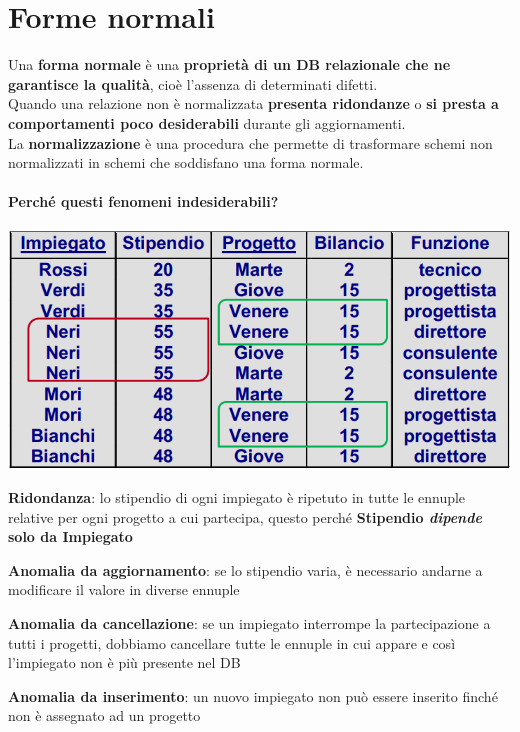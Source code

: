 \documentclass[10pt]{book}
\begin{document}
\section{Forme normali}
Una \textbf{forma normale} è una \textbf{proprietà di un DB relazionale che ne garantisce la qualità}, cioè l'assenza di determinati difetti.\\
Quando una relazione non è normalizzata \textbf{presenta ridondanze} o \textbf{si presta a comportamenti poco desiderabili} durante gli aggiornamenti.\\
La \textbf{normalizzazione} è una procedura che permette di trasformare schemi non normalizzati in schemi che soddisfano una forma normale.
\paragraph{Perché questi fenomeni indesiderabili?}
\begin{center}
	\includegraphics[scale=0.5]{ridondanze.png}
\end{center}
\begin{list}{}{}
	\item \textbf{Ridondanza}: lo stipendio di ogni impiegato è ripetuto in tutte le ennuple relative per ogni progetto a cui partecipa, questo perché \textbf{Stipendio \textit{dipende} solo da Impiegato}
	\item \textbf{Anomalia da aggiornamento}: se lo stipendio varia, è necessario andarne a modificare il valore in diverse ennuple
	\item \textbf{Anomalia da cancellazione}: se un impiegato interrompe la partecipazione a tutti i progetti, dobbiamo cancellare tutte le ennuple in cui appare e così l'impiegato non è più presente nel DB
	\item \textbf{Anomalia da inserimento}: un nuovo impiegato non può essere inserito finché non è assegnato ad un progetto
\end{list}
\end{document}
